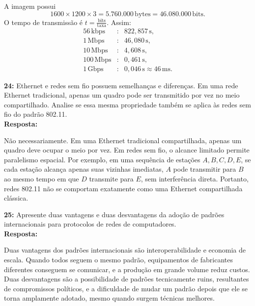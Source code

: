 \documentclass[12pt,a4paper]{report}
\begin{document}
A imagem possui
\[
    1600\times 1200\times 3=5.760.000\,\text{bytes}=46.080.000\,\text{bits}.
\]
O tempo de transmissão é \(t=\frac{\text{bits}}{\text{taxa}}\). Assim:
\[
    \begin{array}{lcl}
        56\,\text{kbps}  & : & 822{,}857\,\text{s},                    \\
        1\,\text{Mbps}   & : & 46{,}080\,\text{s},                     \\
        10\,\text{Mbps}  & : & 4{,}608\,\text{s},                      \\
        100\,\text{Mbps} & : & 0{,}461\,\text{s},                      \\
        1\,\text{Gbps}   & : & 0{,}046\,\text{s}\approx 46\,\text{ms}.
    \end{array}
\]

\vspace{0.6cm}

\noindent \textbf{24:} Ethernet e redes sem fio possuem semelhanças e diferenças. Em uma rede Ethernet tradicional, apenas um quadro pode ser transmitido por vez no meio compartilhado. Analise se essa mesma propriedade também se aplica às redes sem fio do padrão 802.11. \\
\textbf{Resposta:}

Não necessariamente. Em uma Ethernet tradicional compartilhada, apenas um quadro deve ocupar o meio por vez. Em redes sem fio, o alcance limitado permite paralelismo espacial. Por exemplo, em uma sequência de estações \(A, B, C, D, E\), se cada estação alcança apenas suas vizinhas imediatas, \(A\) pode transmitir para \(B\) ao mesmo tempo em que \(D\) transmite para \(E\), sem interferência direta. Portanto, redes 802.11 não se comportam exatamente como uma Ethernet compartilhada clássica.

\vspace{0.6cm}

\noindent \textbf{25:} Apresente duas vantagens e duas desvantagens da adoção de padrões internacionais para protocolos de redes de computadores. \\
\textbf{Resposta:}

Duas vantagens dos padrões internacionais são interoperabilidade e economia de escala. Quando todos seguem o mesmo padrão, equipamentos de fabricantes diferentes conseguem se comunicar, e a produção em grande volume reduz custos. Duas desvantagens são a possibilidade de padrões tecnicamente ruins, resultantes de compromissos políticos, e a dificuldade de mudar um padrão depois que ele se torna amplamente adotado, mesmo quando surgem técnicas melhores.
\end{document}
